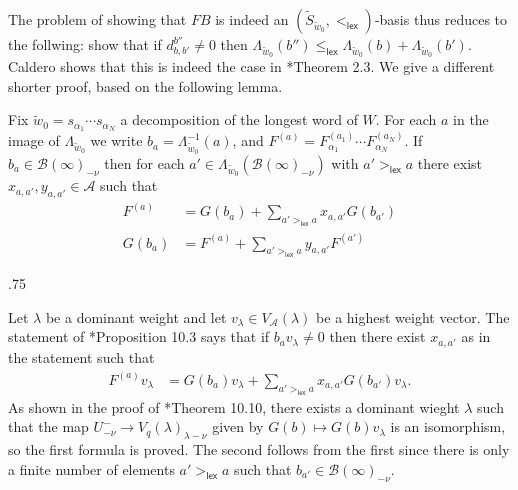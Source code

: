 \documentclass[11pt,fleqn]{article}
\makeatletter
\renewenvironment{proof}[1][\textit{Proof}]{\par
  \pushQED{\qed}%
  \normalfont \topsep.75\paraskip\relax
  \trivlist
  \item[\hskip\labelsep
        \itshape
    #1\@addpunct{.}]\ignorespaces
}{%
  \popQED\endtrivlist\@endpefalse
}
\renewcommand\to{\longrightarrow}
\newcommand\A{\mathcal A}
\newcommand\B{\mathcal B}
\newcommand\lex{\mathsf{lex}}
\newcommand\flagbasis{FB}
\makeatother
\begin{document}
The problem of showing that $\flagbasis$ is indeed an $(\tilde S_{\tilde w_0}, 
<_{\lex})$-basis thus reduces to the follwing: show that if $d_{b,b'}^{b''} 
\neq 0$ then $\Lambda_{\tilde w_0}(b'') \leq_{\lex} \Lambda_{\tilde w_0}(b) + 
\Lambda_{\tilde w_0}(b')$. Caldero shows that this is indeed the case in 
\cite{C}*{Theorem 2.3}. We give a different shorter proof, based on the
following lemma.

\begin{Lemma*}
Fix $\tilde w_0 = s_{\alpha_1} \cdots s_{\alpha_N}$ a decomposition of the 
longest word of $W$. For each $a$ in the image of $\Lambda_{\tilde w_0}$ we 
write $b_a = \Lambda_{\tilde w_0}^{-1}(a)$, and $F^{(a)} = 
F_{\alpha_1}^{(a_1)} \cdots F_{\alpha_N}^{(a_N)}$. If $b_a \in 
\B(\infty)_{-\nu}$ then for each $a' \in \Lambda_{\tilde w_0} 
(\B(\infty)_{-\nu})$ with $a' >_{\lex} a$ there exist $x_{a,a'}, y_{a,a'} \in 
\A$ such that
\begin{align*}
F^{(a)}
  &= G(b_a) + \sum_{a' >_{\lex} a} x_{a,a'} G(b_{a'})\\
G(b_a) 
  &= F^{(a)} + \sum_{a' >_{\lex} a} y_{a,a'} F^{(a')}
\end{align*}
\end{Lemma*}
\begin{proof}
Let $\lambda$ be a dominant weight and let $v_\lambda \in V_\A(\lambda)$ be a  
highest weight vector. The statement of \cite{Lit}*{Proposition 10.3} says that
if $b_a v_{\lambda} \neq 0$ then there exist $x_{a,a'}$ as in the statement
such that
\begin{align*}
F^{(a)}v_\lambda
  &= G(b_a)v_\lambda + \sum_{a' >_{\lex} a} x_{a,a'} G(b_{a'})v_\lambda.
\end{align*}
As shown in the proof of \cite{Jan}*{Theorem 10.10}, there exists a dominant
wieght $\lambda$ such that the map $U^-_{-\nu} \to 
V_q(\lambda)_{\lambda - \nu}$ given by $G(b) \mapsto G(b)v_\lambda$ is an 
isomorphism, so the first formula is proved. The second follows from the first
since there is only a finite number of elements $a' >_{\lex} a$ such that 
$b_{a'} \in \B(\infty)_{-\nu}$.
\end{proof}
\end{document}
